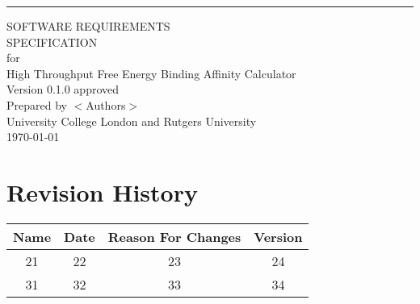 \documentclass{scrreprt}
\date{}
\title{}
\def\myversion{0.1.0 }
\def\projname{High Throughput Free Energy Binding Affinity Calculator}
\def\projauthors{$<$Authors$>$}
\begin{document}
\begin{flushright}
    \rule{16cm}{5pt}\vskip1cm
    \begin{bfseries}
        \Huge{SOFTWARE REQUIREMENTS\\ SPECIFICATION}\\
        \vspace{1.9cm}
        for\\
        \vspace{1.9cm}
        \projname \\
        \vspace{1.9cm}
        \LARGE{Version \myversion approved}\\
        \vspace{1.9cm}
        Prepared by \projauthors\\
        \vspace{1.9cm}
        University College London and Rutgers University\\
        \vspace{1.9cm}
        \today\\
    \end{bfseries}
\end{flushright}

\tableofcontents


\chapter*{Revision History}

\begin{center}
    \begin{tabular}{|c|c|c|c|}
        \hline
        Name & Date & Reason For Changes & Version\\
        \hline
        21 & 22 & 23 & 24\\
        \hline
        31 & 32 & 33 & 34\\
        \hline
    \end{tabular}
\end{center}


\end{document}
